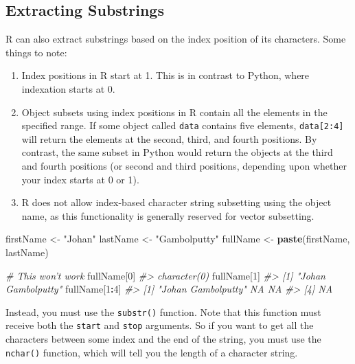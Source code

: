 \documentclass[]{book}
\newenvironment{Shaded}{\begin{snugshade}}{\end{snugshade}}
\newcommand{\KeywordTok}[1]{\textcolor[rgb]{0.13,0.29,0.53}{\textbf{#1}}}
\newcommand{\DecValTok}[1]{\textcolor[rgb]{0.00,0.00,0.81}{#1}}
\newcommand{\StringTok}[1]{\textcolor[rgb]{0.31,0.60,0.02}{#1}}
\newcommand{\CommentTok}[1]{\textcolor[rgb]{0.56,0.35,0.01}{\textit{#1}}}
\newcommand{\OperatorTok}[1]{\textcolor[rgb]{0.81,0.36,0.00}{\textbf{#1}}}
\newcommand{\NormalTok}[1]{#1}
\begin{document}
\subsection{Extracting Substrings}\label{extracting-substrings}

R can also extract substrings based on the index position of its
characters. Some things to note:

\begin{enumerate}
\def\labelenumi{\arabic{enumi}.}
\item
  Index positions in R start at 1. This is in contrast to Python, where
  indexation starts at 0.
\item
  Object subsets using index positions in R contain all the elements in
  the specified range. If some object called \texttt{data} contains five
  elements, \texttt{data{[}2:4{]}} will return the elements at the
  second, third, and fourth positions. By contrast, the same subset in
  Python would return the objects at the third and fourth positions (or
  second and third positions, depending upon whether your index starts
  at 0 or 1).
\item
  R does not allow index-based character string subsetting using the
  object name, as this functionality is generally reserved for vector
  subsetting.
\end{enumerate}

\begin{Shaded}
\begin{Highlighting}[]
\NormalTok{firstName <-}\StringTok{ "Johan"}
\NormalTok{lastName <-}\StringTok{ "Gambolputty"}
\NormalTok{fullName <-}\StringTok{ }\KeywordTok{paste}\NormalTok{(firstName, lastName)}

\CommentTok{# This won't work}
\NormalTok{fullName[}\DecValTok{0}\NormalTok{]}
\CommentTok{#> character(0)}
\NormalTok{fullName[}\DecValTok{1}\NormalTok{]}
\CommentTok{#> [1] "Johan Gambolputty"}
\NormalTok{fullName[}\DecValTok{1}\OperatorTok{:}\DecValTok{4}\NormalTok{]}
\CommentTok{#> [1] "Johan Gambolputty" NA                  NA                 }
\CommentTok{#> [4] NA}
\end{Highlighting}
\end{Shaded}

Instead, you must use the \texttt{substr()} function. Note that this
function must receive both the \texttt{start} and \texttt{stop}
arguments. So if you want to get all the characters between some index
and the end of the string, you must use the \texttt{nchar()} function,
which will tell you the length of a character string.
\end{document}

